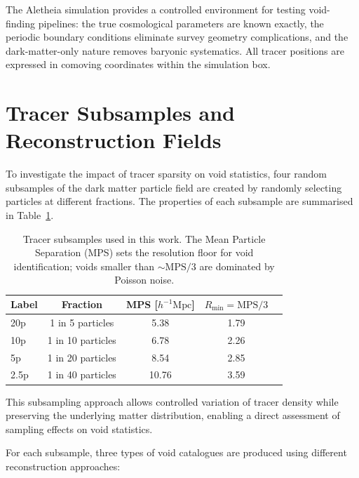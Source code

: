 \documentclass[12pt]{report}
\begin{document}
The Aletheia simulation provides a controlled environment for testing void-finding pipelines: the true cosmological parameters are known exactly, the periodic boundary conditions eliminate survey geometry complications, and the dark-matter-only nature removes baryonic systematics. All tracer positions are expressed in comoving coordinates within the simulation box.


\section{Tracer Subsamples and Reconstruction Fields}
\label{sec:tracers}

To investigate the impact of tracer sparsity on void statistics, four random subsamples of the dark matter particle field are created by randomly selecting particles at different fractions. The properties of each subsample are summarised in Table~\ref{tab:subsamples}.

\begin{table}[H]
    \centering
    \caption{Tracer subsamples used in this work. The Mean Particle Separation (MPS) sets the resolution floor for void identification; voids smaller than $\sim\mathrm{MPS}/3$ are dominated by Poisson noise.}
    \label{tab:subsamples}
    \begin{tabular}{lcccc}
        \toprule
        \textbf{Label} & \textbf{Fraction} & \textbf{MPS [$h^{-1}\mathrm{Mpc}$]} & \textbf{$R_\mathrm{min} = \mathrm{MPS}/3$} \\
        \midrule
        20p  & 1 in 5 particles  & 5.38  & 1.79 \\
        10p  & 1 in 10 particles & 6.78  & 2.26 \\
        5p   & 1 in 20 particles & 8.54  & 2.85 \\
        2.5p & 1 in 40 particles & 10.76 & 3.59 \\
        \bottomrule
    \end{tabular}
\end{table}

This subsampling approach allows controlled variation of tracer density while preserving the underlying matter distribution, enabling a direct assessment of sampling effects on void statistics.

For each subsample, three types of void catalogues are produced using different reconstruction approaches:
\end{document}
